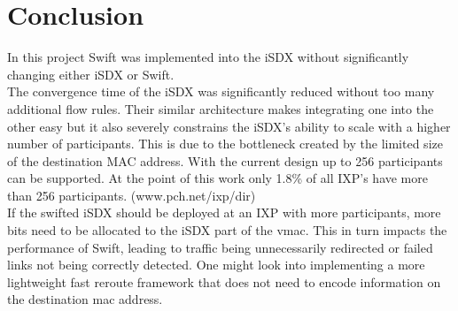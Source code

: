 \chapter{\label{chapter7}Conclusion}
In this project Swift was implemented into the iSDX without significantly changing either iSDX or Swift. \\
The convergence time of the iSDX was significantly reduced without too many additional flow rules. Their similar architecture makes integrating one into the other easy but it also severely constrains the iSDX's ability to scale with a higher number of participants. This is due to the bottleneck created by the limited size of the destination MAC address. With the current design up to 256 participants can be supported. At the point of this work only 1.8\% of all IXP's have more than 256 participants. (www.pch.net/ixp/dir)  \\
If the swifted iSDX should be deployed at an IXP with more participants, more bits need to be allocated to the iSDX part of the vmac. This in turn impacts the performance of Swift, leading to traffic being unnecessarily redirected or failed links not being correctly detected. One might look into implementing a more lightweight fast reroute framework that does not need to encode information on the destination mac address.
